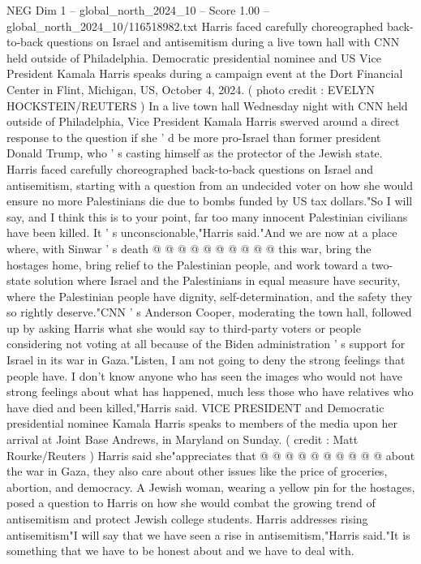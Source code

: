 \begin{textsample}{NEG Dim 1 – global\_north\_2024\_10 – Score 1.00 – global\_north\_2024\_10/116518982.txt}  \label{ex:f1_neg_071}
Harris faced carefully choreographed back-to-back questions on Israel and antisemitism during a live town hall with CNN held outside of Philadelphia.
Democratic presidential nominee and US Vice President Kamala Harris speaks during a campaign event at the Dort Financial Center in Flint, Michigan, US, October 4, 2024. ( photo credit : EVELYN HOCKSTEIN/REUTERS ) In a live town hall Wednesday night with CNN held outside of Philadelphia, Vice President Kamala Harris swerved around a direct response to the question if she ' d be more pro-Israel than former president Donald Trump, who ' s casting himself as the protector of the Jewish state.
Harris faced carefully choreographed back-to-back questions on Israel and antisemitism, starting with a question from an undecided voter on how she would ensure no more Palestinians die due to bombs funded by US tax dollars."So I will say, and I think this is to your point, far too many innocent Palestinian civilians have been killed.
It ' s unconscionable,"Harris said."And we are now at a place where, with Sinwar ' s death @ @ @ @ @ @ @ @ @ @ this war, bring the hostages home, bring relief to the Palestinian people, and work toward a two-state solution where Israel and the Palestinians in equal measure have security, where the Palestinian people have dignity, self-determination, and the safety they so rightly deserve."CNN ' s Anderson Cooper, moderating the town hall, followed up by asking Harris what she would say to third-party voters or people considering not voting at all because of the Biden administration ' s support for Israel in its war in Gaza."Listen, I am not going to deny the strong feelings that people have.
I don't know anyone who has seen the images who would not have strong feelings about what has happened, much less those who have relatives who have died and been killed,"Harris said.
VICE PRESIDENT and Democratic presidential nominee Kamala Harris speaks to members of the media upon her arrival at Joint Base Andrews, in Maryland on Sunday. ( credit : Matt Rourke/Reuters ) Harris said she"appreciates that @ @ @ @ @ @ @ @ @ @ about the war in Gaza, they also care about other issues like the price of groceries, abortion, and democracy.
A Jewish woman, wearing a yellow pin for the hostages, posed a question to Harris on how she would combat the growing trend of antisemitism and protect Jewish college students.
Harris addresses rising antisemitism"I will say that we have seen a rise in antisemitism,"Harris said."It is something that we have to be honest about and we have to deal with.

\end{textsample}
